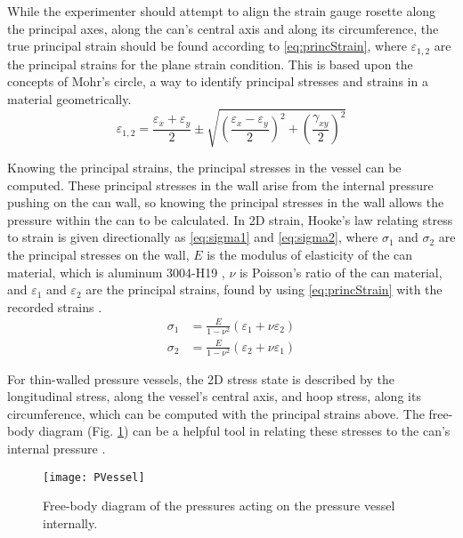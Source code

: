 \documentclass[10pt,journal,letterpaper]{IEEEtran}
\begin{document}
While the experimenter should attempt to align the strain gauge rosette along the principal axes, along the can's central axis and along its circumference, the true principal strain should be found according to \eqref{eq:princStrain}, where $\varepsilon_{1,2}$ are the principal strains for the plane strain condition.
This is based upon the concepts of Mohr’s circle, a way to identify principal stresses and strains in a material geometrically.
\begin{equation}
\label{eq:princStrain}
\varepsilon_{1,2}=\frac{\varepsilon_x+\varepsilon_y}{2} \pm \sqrt{\left(\frac{\varepsilon_x-\varepsilon_y}{2}\right)^2+\left(\frac{\gamma_{xy}}{2}\right)^2}
\end{equation}

Knowing the principal strains, the principal stresses in the vessel can be computed.
These principal stresses in the wall arise from the internal pressure pushing on the can wall, so knowing the principal stresses in the wall allows the pressure within the can to be calculated.
In 2D strain, Hooke's law relating stress to strain is given directionally as \eqref{eq:sigma1} and \eqref{eq:sigma2}, where $\sigma_{1}$ and $\sigma_{2}$ are the principal stresses on the wall, $E$ is the modulus of elasticity of the can material, which is aluminum 3004-H19 \cite{b2}, $\nu$ is Poisson’s ratio of the can material, and $\varepsilon_{1}$ and $\varepsilon_{2}$ are the principal strains, found by using \eqref{eq:princStrain} with the recorded strains \cite{b1}.
\begin{subequations}
\label{eq:sigmas}
\begin{align}
\sigma_1&=\frac{E}{1-\nu^2}\left(\varepsilon_1+\nu\varepsilon_2\right) \label{eq:sigma1} \\
\sigma_2&=\frac{E}{1-\nu^2}\left(\varepsilon_2+\nu\varepsilon_1\right) \label{eq:sigma2}
\end{align}
\end{subequations}

For thin-walled pressure vessels, the 2D stress state is described by the longitudinal stress, along the vessel's central axis, and hoop stress, along its circumference, which can be computed with the principal strains above.
The free-body diagram (Fig. \ref{fig:PVessel}) can be a helpful tool in relating these stresses to the can's internal pressure \cite{b1}.

\begin{figure}[H]
\centering
\texttt{[image: PVessel]}
\caption{Free-body diagram of the pressures acting on the pressure vessel internally.}
\label{fig:PVessel}
\end{figure}
\end{document}
